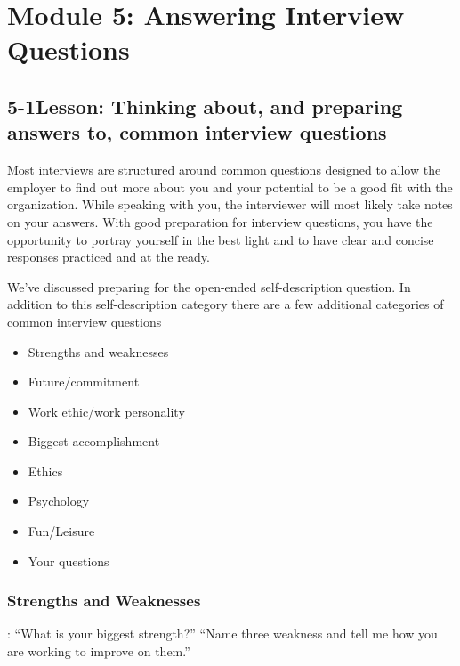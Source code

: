 \pagebreak \section*{Module 5:	Answering Interview Questions}
\noindent\makebox[\textwidth]{\rule{\linewidth}{0.4pt}}  \localtableofcontents
\noindent\makebox[\textwidth]{\rule{\linewidth}{0.4pt}}


\pagebreak \subsection*{5-1\quad Lesson: Thinking about, and preparing answers to, common interview questions}
Most interviews are structured around common questions designed to allow the employer to find out more about you and your potential to be a good fit with the organization. While speaking with you, the interviewer will most likely take notes on your answers. With good preparation for interview questions, you have the opportunity to portray yourself in the best light and to have clear and concise responses practiced and at the ready.

We've discussed preparing for the open-ended self-description question. In addition to this self-description category there are a few additional categories of common interview questions
\begin{itemize}[leftmargin=1.0cm]
	\item Strengths and weaknesses
	\item Future/commitment
	\item Work ethic/work personality
	\item Biggest accomplishment
	\item Ethics
	\item Psychology
	\item Fun/Leisure
	\item Your questions
\end{itemize}
\subsubsection*{Strengths and Weaknesses}:
\break ``What is your biggest strength?''
\break ``Name three weakness and tell me how you are working to improve on them.''


